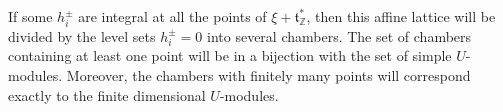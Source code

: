If some $h_i^\pm$ are integral at all the points of $\xi+\mathfrak{t}^*_\mathbb{Z}$, then this affine lattice will be divided by the level sets $h_i^\pm=0$ into several chambers. The set of chambers containing at least one point will be in a bijection with the set of simple $U$-modules. Moreover, the chambers with finitely many points will correspond exactly to the finite dimensional $U$-modules.

